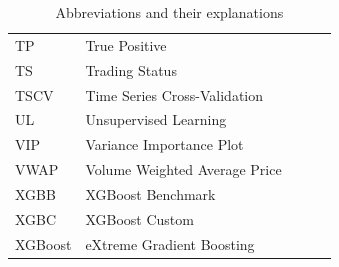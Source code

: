 \begin{table}[H]
\begin{tabularx}{\columnwidth}{lXlXl}
TP & True Positive \\
TS & Trading Status \\
TSCV & Time Series Cross-Validation \\
UL & Unsupervised Learning \\
VIP & Variance Importance Plot \\
VWAP & Volume Weighted Average Price\\
XGBB & XGBoost Benchmark \\
XGBC & XGBoost Custom \\
XGBoost & eXtreme Gradient Boosting \\
\bottomrule
\end{tabularx}
\vspace{1em}
\caption{Abbreviations and their explanations}
\label{abbreviations-and-explanations}
\end{table}




